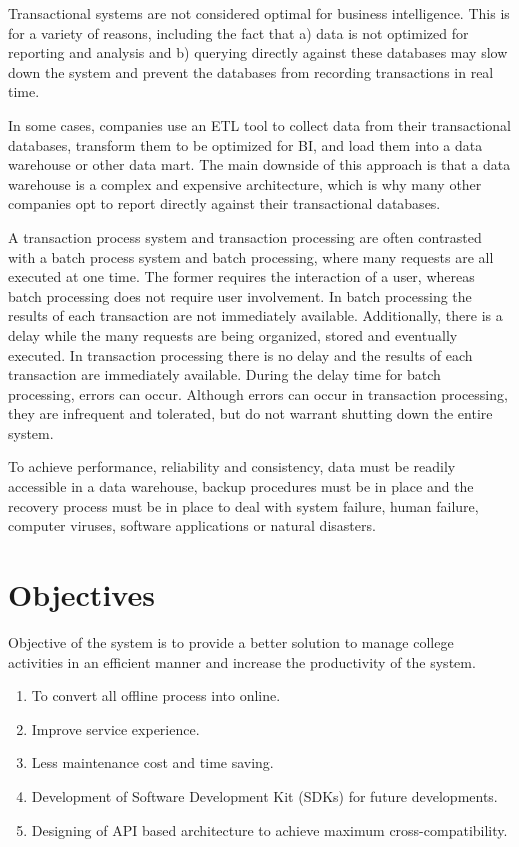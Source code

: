 \par
Transactional systems are not considered optimal for business intelligence. This is for a variety of reasons, including the fact that a) data is not optimized for reporting and analysis and b) querying directly against these databases may slow down the system and prevent the databases from recording transactions in real time.
\par
In some cases, companies use an ETL tool to collect data from their transactional databases, transform them to be optimized for BI, and load them into a data warehouse or other data mart. The main downside of this approach is that a data warehouse is a complex and expensive architecture, which is why many other companies opt to report directly against their transactional databases.
\par
A transaction process system and transaction processing are often contrasted with a batch process system and batch processing, where many requests are all executed at one time. The former requires the interaction of a user, whereas batch processing does not require user involvement. In batch processing the results of each transaction are not immediately available. Additionally, there is a delay while the many requests are being organized, stored and eventually executed. In transaction processing there is no delay and the results of each transaction are immediately available. During the delay time for batch processing, errors can occur. Although errors can occur in transaction processing, they are infrequent and tolerated, but do not warrant shutting down the entire system.
\par
To achieve performance, reliability and consistency, data must be readily accessible in a data warehouse, backup procedures must be in place and the recovery process must be in place to deal with system failure, human failure, computer viruses, software applications or natural disasters.
\par
\section{Objectives}
Objective of the system is to provide a better solution to manage college activities in an efficient manner and increase the productivity of the system.
\begin{enumerate}
\item To convert all offline process into online.
\item Improve service experience.
\item Less maintenance cost and time saving.
\item Development of Software Development Kit (SDKs) for future developments.
\item Designing of API based architecture to achieve maximum cross-compatibility.
\end{enumerate}
